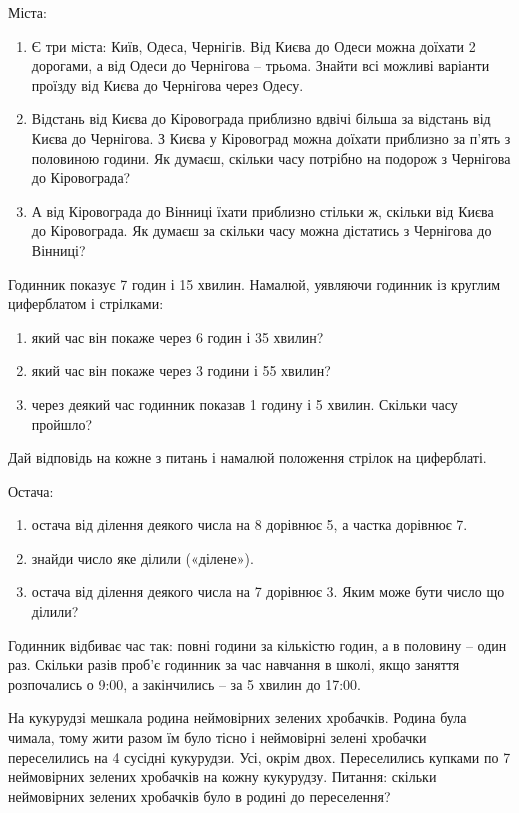 \problem
Міста:
\begin{enumerate}
    \item Є три міста: Київ, Одеса, Чернігів.
    Від Києва до Одеси можна доїхати 2 дорогами,
    а від Одеси до Чернігова – трьома.
    Знайти всі можливі варіанти проїзду від Києва до Чернігова через Одесу.
    \item Відстань від Києва до Кіровограда приблизно вдвічі більша
    за відстань від Києва до Чернігова.
    З Києва у Кіровоград можна доїхати приблизно за п'ять з половиною години.
    Як думаєш, скільки часу потрібно на подорож з Чернігова до Кіровограда?
    \item А від Кіровограда до Вінниці їхати приблизно стільки ж,
    скільки від Києва до Кіровограда.
    Як думаєш за скільки часу можна дістатись з Чернігова до Вінниці?
\end{enumerate}


\problem
Годинник показує 7 годин і 15 хвилин.
Намалюй, уявляючи годинник із круглим циферблатом і стрілками:
\begin{enumerate}
    \item який час він покаже через 6 годин і 35 хвилин?
    \item який час він покаже через 3 години і 55 хвилин?
    \item через деякий час годинник показав 1 годину і 5 хвилин.
    Скільки часу пройшло?
\end{enumerate}
Дай відповідь на кожне з питань і намалюй положення стрілок на циферблаті.


\problem
Остача:
\begin{enumerate}
    \item остача від ділення деякого числа на 8 дорівнює 5,
    а частка дорівнює 7.
    \item знайди число яке ділили («ділене»).
    \item остача від ділення деякого числа на 7 дорівнює 3.
    Яким може бути число що ділили?
\end{enumerate}


\problem
Годинник відбиває час так: повні години за кількістю годин,
а в половину – один раз.
Скільки разів проб’є годинник за час навчання в школі,
якщо заняття розпочались о 9:00, а закінчились – за 5 хвилин до 17:00.


\problem
На кукурудзі мешкала родина неймовірних зелених хробачків.
Родина була чимала, тому жити разом їм було тісно і неймовірні
зелені хробачки переселились на 4 сусідні кукурудзи. Усі, окрім двох.
Переселились купками по 7 неймовірних зелених хробачків на кожну кукурудзу.
Питання: скільки неймовірних зелених хробачків було в родині до переселення?


